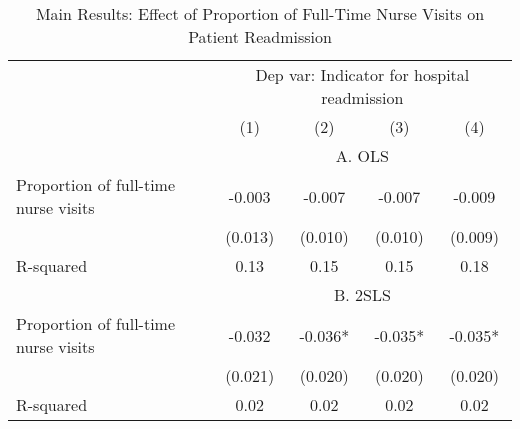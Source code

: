 \documentclass[final,12pt]{article}
\begin{document}
\begin{singlespace}
\clearpage
\begin{table}[H]
\footnotesize
\setlength\tabcolsep{10pt}
\centering
\caption{Main Results: Effect of Proportion of Full-Time Nurse Visits on Patient Readmission}
\label{tab:iv_onquality_2s}
\begin{threeparttable}
\def\sym#1{\ifmmode^{#1}\else\(^{#1}\)\fi}
\begin{tabular}{l*{4}{c}}
\toprule
& \multicolumn{4}{c}{Dep var: Indicator for hospital readmission} \\
 & (1) & (2) & (3) & (4) \\
\midrule
&\multicolumn{4}{c}{A. OLS}\\
\cmidrule{2-5}
Proportion of full-time nurse visits & -0.003 & -0.007 & -0.007 & -0.009 \\
 & (0.013) & (0.010) & (0.010) & (0.009) \\
R-squared & 0.13 & 0.15 & 0.15 & 0.18 \\

\midrule
&\multicolumn{4}{c}{B. 2SLS}\\
\cmidrule{2-5}
Proportion of full-time nurse visits&      -0.032   &      -0.036*  &      -0.035*  &      -0.035*  \\
                    &     (0.021)   &     (0.020)   &     (0.020)   &     (0.020)   \\
R-squared           &        0.02   &        0.02   &        0.02   &        0.02   \\
%


\end{tabular}
\end{threeparttable}
\end{table}
\end{singlespace}
\end{document}
